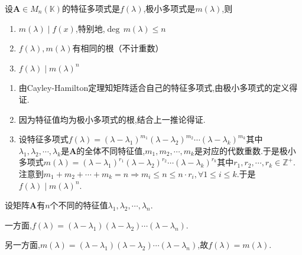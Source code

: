 \begin{green}
\begin{corollary}[特征多项式与极小多项式]\label{cor:特征多项式与极小多项式}
    设$\bm{A}\in M_n\left(\mathbb{K}\right)$的特征多项式是$f\left(\lambda\right)$,极小多项式是$m\left(\lambda\right)$,则
    \begin{enumerate}[label = {\textup{(\arabic*)}}]
        \item $m\left(\lambda\right)\mid f\left(x\right)$,特别地,$\deg\,m\left(\lambda\right)\leqslant n$
        \item $f\left(\lambda\right),m\left(\lambda\right)$有相同的根（不计重数）
        \item $f\left(\lambda\right)\mid m\left(\lambda\right)^n$
    \end{enumerate}
\end{corollary}
\begin{Proof}
\begin{enumerate}[label = {\textup{(\arabic*)}}]
    \item 由\textup{Cayley-Hamilton}定理知矩阵适合自己的特征多项式,由极小多项式的定义得证.
    \item 因为特征值均为极小多项式的根,结合上一推论得证.
    \item 设特征多项式$f\left(\lambda\right)=\left(\lambda-\lambda_1\right)^{m_1}
     \left(\lambda-\lambda_2\right)^{m_2}\cdots\left(\lambda-\lambda_k\right)^{m_k}
    $其中$\lambda_1,\lambda_2,\cdots,\lambda_k$是$\bm{A}$的全体不同特征值,$m_1,m_2,\cdots,m_k$是对应的代数重数.于是极小多项式$m\left(\lambda\right)=\left(
        \lambda-\lambda_1
    \right)^{r_1}
    \left(
        \lambda-\lambda_2
    \right)^{r_2}\cdots\left(
        \lambda-\lambda_k
    \right)^{r_k}
    $其中$r_1,r_2,\cdots,r_k\in\mathbb{Z}^+.$注意到$m_1+m_2+\cdots+m_k=n\Longrightarrow
    m_i\leqslant n\leqslant n\cdot r_i,\forall 1\leqslant i\leqslant k.$于是$f\left(\lambda\right)\mid m\left(\lambda\right)^n$.\qedhere
\end{enumerate}
\end{Proof}
\end{green}
\begin{brown}
\begin{example}
    设矩阵$\bm{A}$有$n$个不同的特征值$\lambda_1,\lambda_2,\cdots,\lambda_n$.
    
    一方面,$f\left(\lambda\right)
    =\left(
        \lambda-\lambda_1
    \right)\left(
        \lambda-\lambda_2
    \right)\cdots\left(
        \lambda-\lambda_n
    \right)$.
    
    另一方面,$m\left(\lambda\right)=\left( 
        \lambda-\lambda_1
    \right)\left(
        \lambda-\lambda_2
    \right)\cdots\left(
        \lambda-\lambda_n
    \right)$,故$f\left(\lambda\right)=m\left(\lambda\right)$.
\end{example}
\end{brown}
